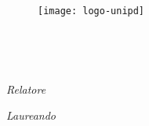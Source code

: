 
\begin{titlepage}

\begin{center}

\begin{LARGE}
\textbf{\myUni}\\
\end{LARGE}

\vspace{10pt}

\begin{Large}
\textsc{\myDepartment}\\
\end{Large}

\vspace{10pt}

\begin{large}
\textsc{\myFaculty}\\
\end{large}

\vspace{30pt}
\begin{figure}[htbp]
\begin{center}
\texttt{[image: logo-unipd]}
\end{center}
\end{figure}
\vspace{30pt} 

\begin{LARGE}
\begin{center}
\textbf{\myTitle}\\
\end{center}
\end{LARGE}

\vspace{10pt} 

\begin{large}
\textsl{\myDegree}\\
\end{large}

\vspace{110pt} 


\begin{large}
	\begin{minipage}{.45\linewidth}
\begin{flushleft}
\textit{Relatore}\\ 
\vspace{5pt} 
\profTitle \myProf
\end{flushleft}
\end{minipage}
\vspace{0pt} 
\begin{minipage}{.45\linewidth}
\begin{flushright}
\textit{Laureando}\\ 
\vspace{5pt} 
\myName
\end{flushright}
\end{minipage}
\end{large}


\end{center}
\end{titlepage}
